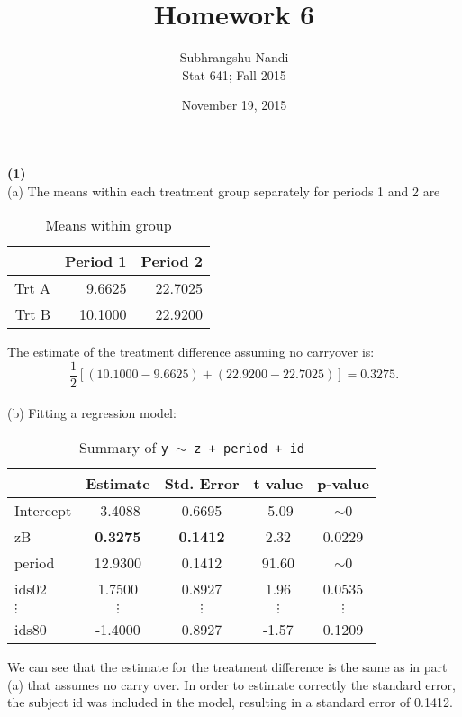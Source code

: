 \documentclass[11pt,a4paper]{article}
\begin{document}
\title{Homework 6}
\author{Subhrangshu Nandi\\
  Stat 641; Fall 2015}
\date{November 19, 2015}

\maketitle

\noindent
\textbf{(1)} \\
(a) The means within each treatment group separately for periods 1 and 2 are
\begin{table}[H]
\centering
\begin{tabular}{rrr}
\hline
& Period 1 & Period 2 \\ 
\hline
Trt A & 9.6625 & 22.7025 \\ 
Trt B & 10.1000 & 22.9200 \\ 
\hline
\end{tabular}
\caption{Means within group}
\end{table}
The estimate of the treatment difference assuming no carryover is:
$$\dfrac{1}{2}[(10.1000-9.6625)+(22.9200-22.7025)]=0.3275.$$ \\
\noindent
(b) Fitting a regression model:
\begin{table}[H]
\centering
\begin{tabular}{lcccc}
  \hline
 & Estimate & Std. Error & t value & p-value \\ 
  \hline
Intercept & -3.4088 & 0.6695 & -5.09 & $\sim$0 \\ 
  zB &  \textbf{0.3275} & \textbf{0.1412} & 2.32 & 0.0229 \\ 
  period & 12.9300 & 0.1412 & 91.60 & $\sim$0 \\ 
  ids02 & 1.7500 & 0.8927 & 1.96 & 0.0535 \\ 
$\vdots$ & $\vdots$ & $\vdots$ & $\vdots$ & $\vdots$ \\ 
  ids80 & -1.4000 & 0.8927 & -1.57 & 0.1209 \\ 
   \hline
\end{tabular}
\caption{Summary of \texttt{y}$\ \sim\ $\texttt{z + period + id}}
\end{table}

We can see that the estimate for the treatment difference is the same as in part (a) that assumes no carry over. In order to estimate correctly the standard error, the subject id was included in the model, resulting in a standard error of 0.1412.
\end{document}
